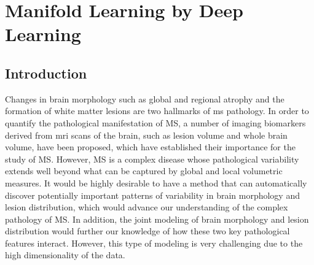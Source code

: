 \chapter{Manifold Learning by Deep Learning}
\label{sec:manifold}

\section{Introduction}

Changes in brain morphology such as global and regional atrophy and the
formation of white matter lesions are two hallmarks of \gls{ms} pathology. In
order to quantify the pathological manifestation of MS, a number of imaging
biomarkers derived from \gls{mri} scans of the brain, such as lesion volume and
whole brain volume, have been proposed, which have established their importance
for the study of MS. However, MS is a complex disease whose pathological
variability extends well beyond what can be captured by global and local
volumetric measures. It would be highly desirable to have a method that can
automatically discover potentially important patterns of variability in brain
morphology and lesion distribution, which would advance our understanding of the
complex pathology of MS. In addition, the joint modeling of brain morphology and
lesion distribution would further our knowledge of how these two key
pathological features interact. However, this type of modeling is very
challenging due to the high dimensionality of the data.

